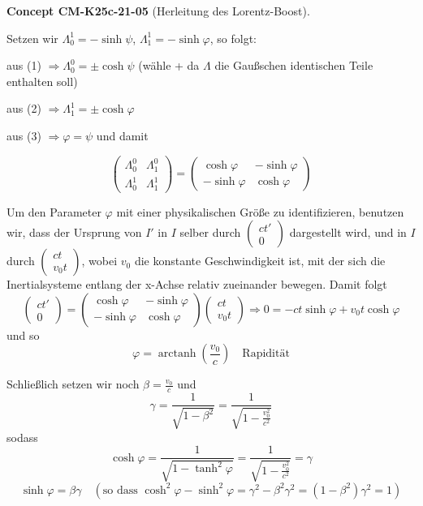 \documentclass[10pt, letterpaper]{article}
\newcommand{\CustomHeading}[3]{%
  \par\medskip\noindent%
  \textbf{#1 #2} \textnormal{(#3)}.\enskip%
}
\newenvironment{CONC}[2]{\CustomHeading{Concept}{#1}{#2}}{}
\begin{document}
\begin{CONC}{CM-K25c-21-05}{Herleitung des Lorentz-Boost}
Setzen wir $\Lambda^1_0 = -\sinh\psi$, $\Lambda^1_1 = -\sinh\varphi$, so folgt:

aus (1) $\Rightarrow \Lambda^0_0 = \pm\cosh\psi$ (wähle + da $\Lambda$ die Gaußschen identischen Teile enthalten soll)

aus (2) $\Rightarrow \Lambda^1_1 = \pm\cosh\varphi$

aus (3) $\Rightarrow \varphi = \psi$
und damit

\[
\begin{pmatrix}
\Lambda^0_0 & \Lambda^0_1 \\
\Lambda^1_0 & \Lambda^1_1
\end{pmatrix} = 
\begin{pmatrix}
\cosh\varphi & -\sinh\varphi \\
-\sinh\varphi & \cosh\varphi
\end{pmatrix}
\]

Um den Parameter $\varphi$ mit einer physikalischen Größe zu identifizieren, benutzen wir, dass der Ursprung von $I'$ in $I$ selber durch $\begin{pmatrix} ct' \\ 0 \end{pmatrix}$ dargestellt wird, und in $I$ durch $\begin{pmatrix} ct \\ v_0t \end{pmatrix}$, wobei $v_0$ die konstante Geschwindigkeit ist, mit der sich die Inertialsysteme entlang der x-Achse relativ zueinander bewegen. Damit folgt
\[
\begin{pmatrix} ct' \\ 0 \end{pmatrix} = 
\begin{pmatrix}
\cosh\varphi & -\sinh\varphi \\
-\sinh\varphi & \cosh\varphi
\end{pmatrix}
\begin{pmatrix} ct \\ v_0t \end{pmatrix} \Rightarrow 0 = -ct\sinh\varphi + v_0t\cosh\varphi
\]
und so
\[
\varphi = \operatorname{arctanh}\left(\frac{v_0}{c}\right) \quad \text{Rapidität}
\]

Schließlich setzen wir noch $\beta = \frac{v_0}{c}$ und
$$\gamma = \frac{1}{\sqrt{1-\beta^2}} = \frac{1}{\sqrt{1-\frac{v_0^2}{c^2}}}$$
sodass
\[
\cosh\varphi = \frac{1}{\sqrt{1-\tanh^2\varphi}} = \frac{1}{\sqrt{1-\frac{v_0^2}{c^2}}} = \gamma
\]
\[
\sinh\varphi = \beta\gamma \quad (\text{so dass } \cosh^2\varphi-\sinh^2\varphi = \gamma^2-\beta^2\gamma^2 = (1-\beta^2)\gamma^2=1)
\]


\end{CONC}
\end{document}
